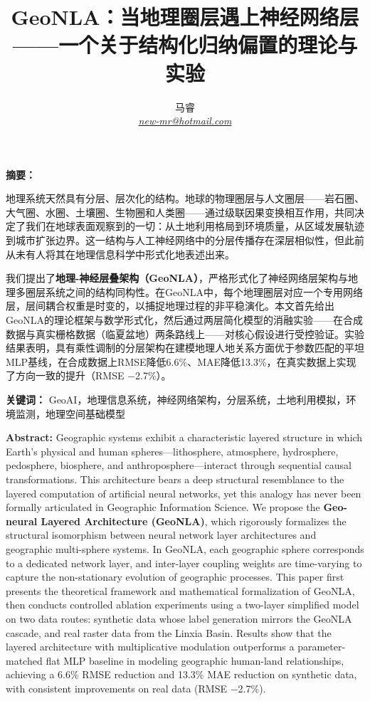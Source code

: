 \documentclass[11pt,a4paper]{article}
\title{\textbf{GeoNLA：当地理圈层遇上神经网络层\\——一个关于结构化归纳偏置的理论与实验}}
\author{马睿\\\textit{\href{mailto:new-mr@hotmail.com}{new-mr@hotmail.com}}}
\date{}
\renewenvironment{abstract}{%
  \normalfont\small
  \noindent\textbf{摘要：}\ignorespaces
}{\par\medskip}
\begin{document}
\maketitle

\begin{abstract}
地理系统天然具有分层、层次化的结构。地球的物理圈层与人文圈层——岩石圈、大气圈、水圈、土壤圈、生物圈和人类圈——通过级联因果变换相互作用，共同决定了我们在地球表面观察到的一切：从土地利用格局到环境质量，从区域发展轨迹到城市扩张边界。这一结构与人工神经网络中的分层传播存在深层相似性，但此前从未有人将其在地理信息科学中形式化地表述出来。

我们提出了\textbf{地理-神经层叠架构（GeoNLA）}，严格形式化了神经网络层架构与地理多圈层系统之间的结构同构性。在GeoNLA中，每个地理圈层对应一个专用网络层，层间耦合权重是时变的，以捕捉地理过程的非平稳演化。本文首先给出GeoNLA的理论框架与数学形式化，然后通过两层简化模型的消融实验——在合成数据与真实栅格数据（临夏盆地）两条路线上——对核心假设进行受控验证。实验结果表明，具有乘性调制的分层架构在建模地理人地关系方面优于参数匹配的平坦MLP基线，在合成数据上RMSE降低6.6\%、MAE降低13.3\%，在真实数据上实现了方向一致的提升（RMSE $-$2.7\%）。
\end{abstract}

\noindent\textbf{关键词：} GeoAI，地理信息系统，神经网络架构，分层系统，土地利用模拟，环境监测，地理空间基础模型

\bigskip

\noindent\textbf{Abstract:} Geographic systems exhibit a characteristic layered structure in which Earth's physical and human spheres---lithosphere, atmosphere, hydrosphere, pedosphere, biosphere, and anthroposphere---interact through sequential causal transformations. This architecture bears a deep structural resemblance to the layered computation of artificial neural networks, yet this analogy has never been formally articulated in Geographic Information Science. We propose the \textbf{Geo-neural Layered Architecture (GeoNLA)}, which rigorously formalizes the structural isomorphism between neural network layer architectures and geographic multi-sphere systems. In GeoNLA, each geographic sphere corresponds to a dedicated network layer, and inter-layer coupling weights are time-varying to capture the non-stationary evolution of geographic processes. This paper first presents the theoretical framework and mathematical formalization of GeoNLA, then conducts controlled ablation experiments using a two-layer simplified model on two data routes: synthetic data whose label generation mirrors the GeoNLA cascade, and real raster data from the Linxia Basin. Results show that the layered architecture with multiplicative modulation outperforms a parameter-matched flat MLP baseline in modeling geographic human-land relationships, achieving a 6.6\% RMSE reduction and 13.3\% MAE reduction on synthetic data, with consistent improvements on real data (RMSE $-$2.7\%).
\end{document}
